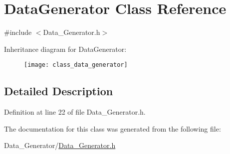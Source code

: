 \hypertarget{class_data_generator}{}\section{Data\+Generator Class Reference}
\label{class_data_generator}


{\ttfamily \#include $<$Data\+\_\+\+Generator.\+h$>$}

Inheritance diagram for Data\+Generator\+:\begin{figure}[H]
\begin{center}
\leavevmode
\texttt{[image: class\_data\_generator]}
\end{center}
\end{figure}


\subsection{Detailed Description}


Definition at line 22 of file Data\+\_\+\+Generator.\+h.



The documentation for this class was generated from the following file\+:\begin{DoxyCompactItemize}
\item 
Data\+\_\+\+Generator/\hyperlink{_data___generator_8h}{Data\+\_\+\+Generator.\+h}\end{DoxyCompactItemize}
